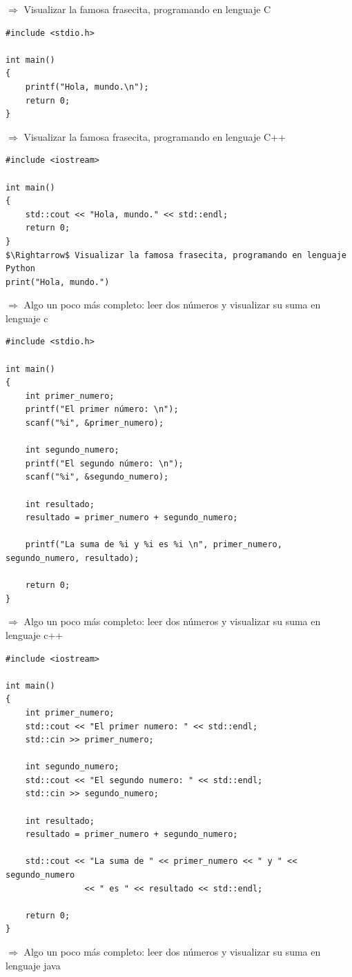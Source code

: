 \documentclass[spanish,12pt,a4paper,final,oneside]{book}
\begin{document}
$\Rightarrow$ Visualizar la famosa frasecita, programando en lenguaje C
\begin{lstlisting}[frame=single]
#include <stdio.h>
 
int main()
{
    printf("Hola, mundo.\n");
    return 0;
}
\end{lstlisting}
$\Rightarrow$ Visualizar la famosa frasecita, programando en lenguaje C++
\begin{lstlisting}[frame=single]
#include <iostream>
 
int main()
{
    std::cout << "Hola, mundo." << std::endl;
    return 0;
}
$\Rightarrow$ Visualizar la famosa frasecita, programando en lenguaje Python
print("Hola, mundo.")
\end{lstlisting} 
$\Rightarrow$ Algo un poco más completo: leer dos números y visualizar su suma
en lenguaje c
\begin{lstlisting}[frame=single]
#include <stdio.h>
 
int main()
{
   	int primer_numero;
   	printf("El primer número: \n");
   	scanf("%i", &primer_numero);
 
   	int segundo_numero;
   	printf("El segundo número: \n");
   	scanf("%i", &segundo_numero);
 
   	int resultado;
   	resultado = primer_numero + segundo_numero;
 
   	printf("La suma de %i y %i es %i \n", primer_numero, segundo_numero, resultado);
 
   	return 0;
}
\end{lstlisting}
$\Rightarrow$ Algo un poco más completo: leer dos números y visualizar su suma en lenguaje c++
\begin{lstlisting}[frame=single]
#include <iostream>
 
int main()
{
   	int primer_numero;
   	std::cout << "El primer numero: " << std::endl;
   	std::cin >> primer_numero;
 
   	int segundo_numero;
   	std::cout << "El segundo numero: " << std::endl;
   	std::cin >> segundo_numero;
 
   	int resultado;
   	resultado = primer_numero + segundo_numero;
 
   	std::cout << "La suma de " << primer_numero << " y " << segundo_numero
             	<< " es " << resultado << std::endl;
 
   	return 0;
}
\end{lstlisting}
$\Rightarrow$ Algo un poco más completo: leer dos números y visualizar su suma en lenguaje java
\end{document}
